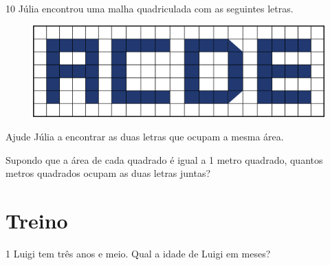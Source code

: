 \num{10} Júlia encontrou uma malha quadriculada com as seguintes letras.

\begin{figure}[htpb!]
\centering
\includegraphics[width=.6\textwidth]{media/image34.png}
\end{figure}

\begin{escolha}
\item Ajude Júlia a encontrar as duas letras que ocupam a mesma área. 

\item Supondo que a área de cada quadrado é igual a 1 metro quadrado, 
quantos metros quadrados ocupam as duas letras juntas?

\end{escolha}

\pagebreak
\section*{Treino}

\num{1} Luigi tem três anos e meio. Qual a idade de Luigi em meses?

